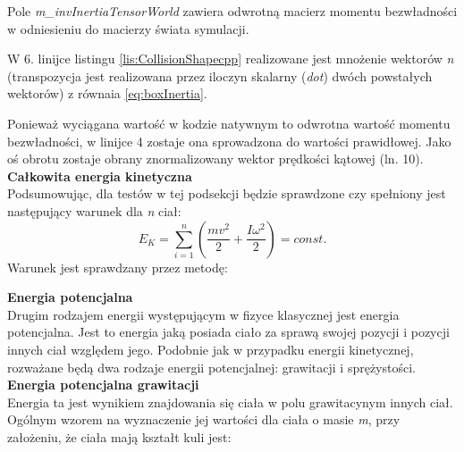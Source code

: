 

Pole \emph{m\_invInertiaTensorWorld} zawiera odwrotną macierz momentu
bezwładności w odniesieniu do macierzy świata symulacji.
\newpage



W 6. linijce listingu \ref{lis:CollisionShapecpp} realizowane jest mnożenie wektorów
\emph{n} (transpozycja jest realizowana przez iloczyn skalarny (\emph{dot})
dwóch powstałych wektorów) z równaia \ref{eq:boxInertia}.



Ponieważ wyciągana wartość w kodzie natywnym to odwrotna wartość momentu
bezwładności, w linijce 4 zostaje ona sprowadzona do wartości prawidłowej. Jako
oś obrotu zostaje obrany znormalizowany wektor prędkości kątowej (ln. 10).\\


\textbf{Całkowita energia kinetyczna}\\
Podsumowując, dla testów w tej podsekcji będzie sprawdzone czy
spełniony jest następujący warunek dla \emph{n} ciał:
\begin{equation}
E_{K} = \sum_{i=1}^{n}\left(\frac{mv^{2}}{2} + \frac{I\omega^{2}}{2}\right) =
const.
\end{equation}
\newpage
Warunek jest sprawdzany przez metodę:



\textbf{Energia potencjalna}\\
Drugim rodzajem energii występującym w fizyce klasycznej jest energia
potencjalna. Jest to energia jaką posiada ciało za sprawą swojej pozycji i
pozycji innych ciał względem jego. Podobnie jak w przypadku energii
kinetycznej, rozważane będą dwa rodzaje energii potencjalnej: grawitacji i
sprężystości.\\

\textbf{Energia potencjalna grawitacji}\\
Energia ta jest wynikiem znajdowania się ciała w polu grawitacynym innych ciał.
Ogólnym wzorem na wyznaczenie jej wartości dla ciała o masie \emph{m}, przy
założeniu, że ciała mają kształt kuli jest:


